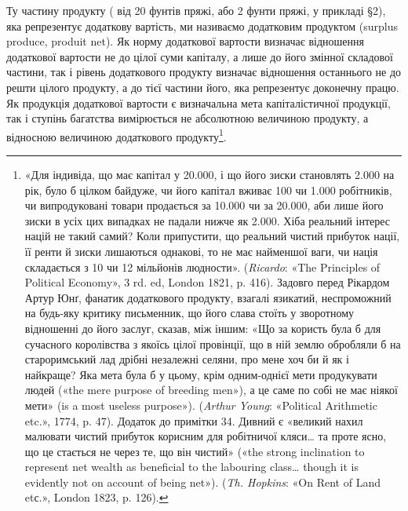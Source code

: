Ту частину продукту ( від 20 фунтів пряжі, або 2 фунти пряжі, у
прикладі §2), яка репрезентує додаткову вартість, ми
називаємо додатковим продуктом (surplus produce, produit net). Як норму
додаткової вартости визначає відношення додаткової
вартости не до цілої суми капіталу, а лише до його змінної складової частини,
так і рівень додаткового продукту визначає відношення останнього не до решти
цілого продукту, а до тієї частини його, яка репрезентує доконечну працю.
Як продукція додаткової вартости є визначальна мета
капіталістичної продукції, так і ступінь багатства вимірюється не абсолютною
величиною продукту, а відносною величиною додаткового продукту\footnote{
«Для індивіда, що має капітал у \num{20.000}, і що його зиски
становлять \num{2.000} на рік, було б цілком байдуже, чи його
капітал вживає 100 чи \num{1.000} робітників, чи випродуковані товари продається
за \num{10.000} чи за \num{20.000}, аби лише
його зиски в усіх цих випадках не падали нижче як \num{2.000}. Хіба реальний інтерес націй не такий самий? Коли припустити, що
реальний чистий прибуток нації, її ренти й зиски лишаються однакові, то не має
найменшої ваги, чи нація складається з 10 чи
12 мільйонів людности». (\emph{Ricardo}: «The Principles of Political Economy»,
3 rd. ed, London 1821, p. 416). Задовго перед Рікардом Артур Юнґ, фанатик
додаткового продукту, взагалі язикатий, неспроможний
на будь-яку критику письменник, що його слава стоїть у зворотному відношенні
до його заслуг, сказав, між іншим: «Що за користь була б для сучасного
королівства з якоїсь цілої провінції, що в ній землю обробляли б на
староримський лад дрібні незалежні селяни, про мене хоч би
й як і найкраще? Яка мета була б у цьому, крім одним-однієї мети продукувати
людей («the mere purpose of breeding men»), а це саме по собі не має
ніякої мети» (is a most useless purpose»). (\emph{Arthur Young}: «Political
Arithmetic etc.», 1774, p. 47).
Додаток до примітки 34. Дивний є «великий нахил малювати чистий прибуток
корисним для робітничої кляси\dots{} та проте ясно, що це стається не через те,
що він чистий» («the strong inclination to
represent net wealth as beneficial to the labouring class\dots{} though it
is evidently not on account
of being net»). (\emph{Th. Hopkins}: «On Rent of Land etс.», London 1823, p. 126).
}.
